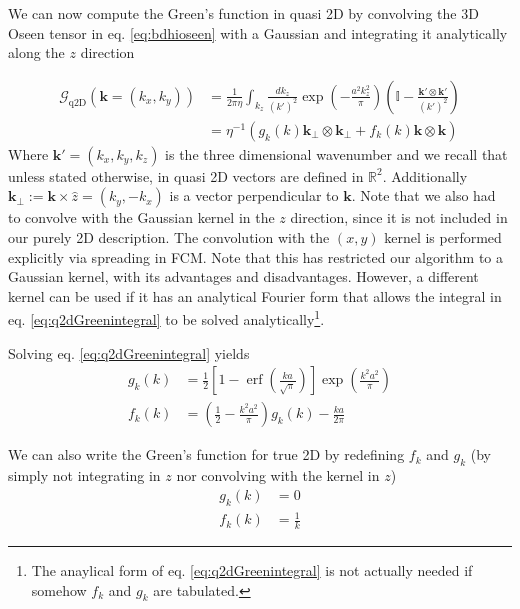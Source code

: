 \documentclass[ twoside,openright,titlepage,numbers=noenddot,%
headinclude,footinclude,cleardoublepage=empty,abstract=on,
BCOR=5mm,paper=a4,fontsize=11pt, dvipsnames
]{scrreprt}
\renewcommand{\vec}[1]{\bm{#1}}
\newcommand{\tens}[1]{\bm{\mathcal{#1}}}
\newcommand{\fou}[1]{\widehat{#1}}
\DeclareMathOperator{\erf}{erf}
\begin{document}
We can now compute the Green's function in quasi 2D by convolving the 3D Oseen tensor in eq. \eqref{eq:bdhioseen} with a Gaussian and integrating it analytically along the $z$ direction

\begin{equation}
  \label{eq:q2dGreenintegral}
  \begin{aligned}
  \fou{\tens{G}}_{\text{q2D}}(\vec{k} = (k_x, k_y)) &= \frac{1}{2\pi\eta}\int_{k_z} \frac{dk_z}{(k')^2}\exp\left(-\frac{a^2k_z^2}{\pi}\right)\left( \mathbb{I} - \frac{\vec{k}'\otimes\vec{k}'}{(k')^2}\right) \\
  &= \eta^{-1}\left(g_k(k)\vec{k}_{\perp}\otimes\vec{k}_{\perp} + f_k(k)\vec{k}\otimes\vec{k}\right)
\end{aligned}
\end{equation}
Where $\vec{k}' = (k_x, k_y, k_z)$ is the three dimensional wavenumber and we recall that unless stated otherwise, in quasi 2D vectors are defined in $\mathbb{R}^2$. Additionally $\vec{k}_\perp := \vec{k}\times\hat{z} = (k_y, -k_x)$ is a vector perpendicular to $\vec{k}$. Note that we also had to convolve with the Gaussian kernel in the $z$ direction, since it is not included in our purely 2D description. The convolution with the $(x,y)$ kernel is performed explicitly via spreading in \gls{FCM}.
Note that this has restricted our algorithm to a Gaussian kernel, with its advantages and disadvantages. However, a different kernel can be used if it has an analytical Fourier form that allows the integral in eq. \eqref{eq:q2dGreenintegral} to be solved analytically\footnote{The anaylical form of eq. \eqref{eq:q2dGreenintegral} is not actually needed if somehow $f_k$ and $g_k$ are tabulated.}.

Solving eq. \eqref{eq:q2dGreenintegral} yields
\begin{equation}
  \label{eq:q2dfg}
  \begin{aligned}
    g_{k}\left(k\right) & = \frac{1}{2}\left[1-{\erf}\left(\frac{ka}{\sqrt{\pi}}\right)\right]\exp\left(\frac{k^2a^2}{\pi}\right)\\
    f_{k}\left(k\right) & = \left(\frac{1}{2} - \frac{k^{2}a^2}{\pi}\right)g_k(k) - \frac{ka}{2\pi}
  \end{aligned}  
\end{equation}

We can also write the Green's function for true 2D by redefining $f_k$ and $g_k$ (by simply not integrating in $z$ nor convolving with the kernel in $z$)
\begin{equation}
  \label{eq:t2dfg}
  \begin{aligned}
    g_{k}\left(k\right) & = 0\\
    f_{k}\left(k\right) & = \frac{1}{k}
  \end{aligned}  
\end{equation}
\end{document}
